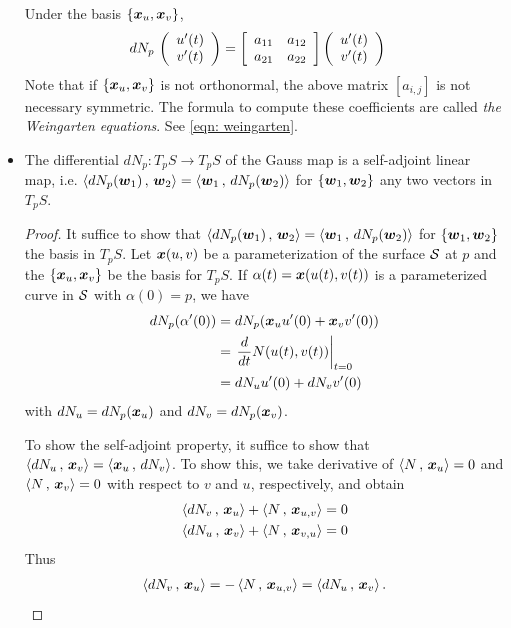 \documentclass[11pt]{article}
\begin{document}
\begin{itemize}
Under the basis $\left\{\boldsymbol{x}_{u}, \boldsymbol{x}_{v}\right\}$, 
\begin{align}
dN_{p}\,\left(\begin{array}{c}
u'(t)  \\ 
v'(t) 
\end{array} \right) &= 
\left[\begin{array}{cc}
a_{11} & a_{12} \\ 
a_{21} & a_{22}
\end{array} \right]\left(\begin{array}{c}
u'(t)  \\ 
v'(t) 
\end{array} \right)  \label{eqn: Gauss_map_coord}
\end{align}
Note that if $\left\{\boldsymbol{x}_{u}, \boldsymbol{x}_{v}\right\}$ is not orthonormal, the above matrix $[a_{i,j}]$ is not necessary symmetric. The formula to compute these coefficients are called \emph{the Weingarten equations}. See \eqref{eqn: weingarten}. \\


\item \begin{proposition}\label{prop: Gauss_selfadj}
The differential $dN_{p}:  T_{p}S \rightarrow T_{p}S$ of the Gauss map is a self-adjoint linear map, i.e. $\left\langle dN_{p}(\boldsymbol{w}_{1})\,,\, \boldsymbol{w}_{2} \right\rangle = \left\langle \boldsymbol{w}_{1}\,,\, dN_{p}(\boldsymbol{w}_{2}) \right\rangle  $ for $\left\{\boldsymbol{w}_{1}, \boldsymbol{w}_{2}\right\}$ any two vectors in $T_{p}S$. 
\end{proposition}
\begin{proof}
It suffice to show that $\left\langle dN_{p}(\boldsymbol{w}_{1})\,,\, \boldsymbol{w}_{2} \right\rangle = \left\langle \boldsymbol{w}_{1}\,,\, dN_{p}(\boldsymbol{w}_{2}) \right\rangle  $ for $\left\{\boldsymbol{w}_{1}, \boldsymbol{w}_{2}\right\}$ the basis in $T_{p}S$. Let $\boldsymbol{x}(u,v)$ be a parameterization of the surface ${\mathcal S}$ at $p$ and the $\left\{\boldsymbol{x}_{u}, \boldsymbol{x}_{v}\right\}$ be the basis for $T_{p}S$. If $\alpha(t) = \boldsymbol{x}(u(t), v(t))$ is a parameterized curve in ${\mathcal S}$ with $\alpha(0) = p$, we have 
\begin{align*}
dN_{p}(\alpha'(0)) &= dN_{p}( \boldsymbol{x}_{u}u'(0) + \boldsymbol{x}_{v}v'(0) )\\
&= \left.{\frac{d}{dt}N(u(t), v(t) )}\right\vert_{t=0}\\
&= dN_{u}u'(0) + dN_{v}v'(0)
\end{align*} with $dN_{u} = dN_{p}( \boldsymbol{x}_{u})$ and  $dN_{v} = dN_{p}( \boldsymbol{x}_{v})$.

To show the self-adjoint property, it suffice to show that $\left\langle dN_{u}\,,\, \boldsymbol{x}_{v} \right\rangle = \left\langle \boldsymbol{x}_{u}\,,\, dN_{v} \right\rangle$. To show this, we take derivative of $\left\langle N\,,\, \boldsymbol{x}_{u} \right\rangle = 0$ and $\left\langle N\,,\, \boldsymbol{x}_{v} \right\rangle = 0$ with respect to $v$ and $u$, respectively, and obtain
\begin{align*}
\left\langle dN_{v}\,,\, \boldsymbol{x}_{u} \right\rangle  + \left\langle N\,,\, \boldsymbol{x}_{u,v} \right\rangle = 0\\
\left\langle dN_{u}\,,\, \boldsymbol{x}_{v} \right\rangle  + \left\langle N\,,\, \boldsymbol{x}_{v,u} \right\rangle = 0
\end{align*}
Thus
\begin{align}
\left\langle dN_{v}\,,\, \boldsymbol{x}_{u} \right\rangle  = -  \left\langle N\,,\, \boldsymbol{x}_{u,v} \right\rangle  = \left\langle dN_{u}\,,\, \boldsymbol{x}_{v} \right\rangle.  \label{eqn: the_2nd_fundamental_form_normal_curvature} 
\end{align}\QEDA
\end{proof}
\end{itemize}
\end{document}
